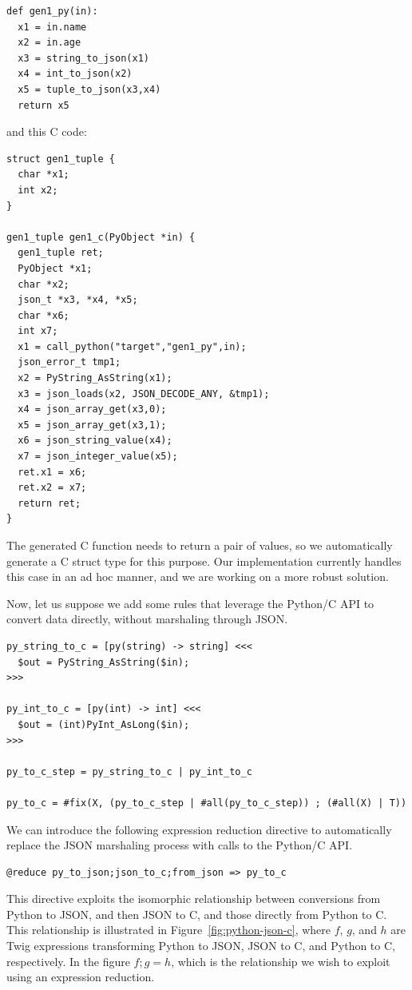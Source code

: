 \begin{verbatim}
def gen1_py(in):
  x1 = in.name
  x2 = in.age
  x3 = string_to_json(x1)
  x4 = int_to_json(x2)
  x5 = tuple_to_json(x3,x4)
  return x5
\end{verbatim}

\noindent and this C code:

\begin{verbatim}
struct gen1_tuple {
  char *x1;
  int x2;
}

gen1_tuple gen1_c(PyObject *in) {
  gen1_tuple ret;
  PyObject *x1;
  char *x2;
  json_t *x3, *x4, *x5;
  char *x6;
  int x7;
  x1 = call_python("target","gen1_py",in);
  json_error_t tmp1;
  x2 = PyString_AsString(x1);
  x3 = json_loads(x2, JSON_DECODE_ANY, &tmp1);
  x4 = json_array_get(x3,0);
  x5 = json_array_get(x3,1);
  x6 = json_string_value(x4);
  x7 = json_integer_value(x5);
  ret.x1 = x6;
  ret.x2 = x7;
  return ret;
}
\end{verbatim}

The generated C function needs to return a pair of values, so we
automatically generate a C struct type for this purpose. Our
implementation currently handles this case in an ad hoc manner,
and we are working on a more robust solution.

Now, let us suppose we add some rules that leverage the Python/C
API to convert data directly, without marshaling through JSON.

\begin{verbatim}
py_string_to_c = [py(string) -> string] <<<
  $out = PyString_AsString($in);
>>>

py_int_to_c = [py(int) -> int] <<<
  $out = (int)PyInt_AsLong($in);
>>>

py_to_c_step = py_string_to_c | py_int_to_c

py_to_c = #fix(X, (py_to_c_step | #all(py_to_c_step)) ; (#all(X) | T))
\end{verbatim}

We can introduce the following expression reduction directive to
automatically replace the JSON marshaling process with calls to
the Python/C API.

\begin{verbatim}
@reduce py_to_json;json_to_c;from_json => py_to_c
\end{verbatim}

This directive exploits the isomorphic relationship between conversions from
Python to JSON, and then JSON to C, and those directly from Python to C. This
relationship is illustrated in Figure~\ref{fig:python-json-c}, where $f$, $g$,
and $h$ are Twig expressions transforming Python to JSON, JSON to C, and
Python to C, respectively. In the figure $f;g = h$, which is the relationship
we wish to exploit using an expression reduction.

